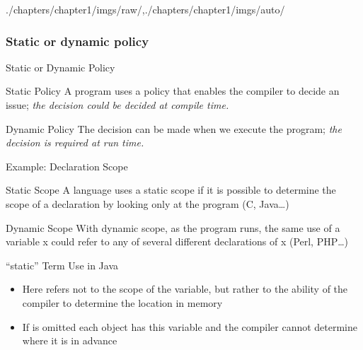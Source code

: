 \begin{graphicspathcontext}{{./chapters/chapter1/imgs/raw/},{./chapters/chapter1/imgs/auto/}}
\begin{bibunit}[apalike]
\subsubsection{Static or dynamic policy}
\begin{frame}{Static or Dynamic Policy}
	\vspace{1cm}
	\begin{definitionblock}{Static Policy}
	A program uses a policy that enables the compiler to decide an issue; \emph{the decision could be decided at compile time.}
	\end{definitionblock}
	\vspace{.5cm}
	\begin{definitionblock}{Dynamic Policy}
	The decision can be made when we execute the program; \emph{the decision is required at run time.}
	\end{definitionblock}
\end{frame}

\begin{frame}{Example: Declaration Scope}
	\begin{definitionblock}{Static Scope}
		A language uses a static scope if it is possible to determine the scope of a declaration by looking only at the program (C, Java\dots)
	\end{definitionblock}
	\vspace{1cm}
	\begin{definitionblock}{Dynamic Scope}
		With dynamic scope, as the program runs, the same use of a variable x could refer to any of several different declarations of x (Perl, PHP\dots)
	\end{definitionblock}
\end{frame}

\begin{frame}{{``static'' Term Use} in Java}
	\begin{center}
	\end{center}
	\vfill
	\begin{itemize}
	\item Here  refers not to the scope of the variable, but rather to the ability of the compiler to determine the location in memory
	\vfill
	\item If  is omitted each object has this variable and the compiler cannot determine where it is in advance
	\end{itemize}
\end{frame}


\end{bibunit}
\end{graphicspathcontext}

